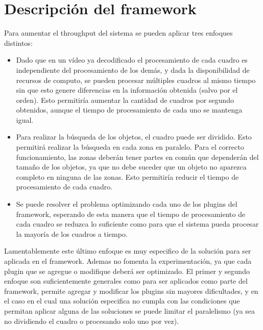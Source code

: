 
\section{Descripción del framework}

Para aumentar el throughput del sistema se pueden aplicar tres enfoques distintos:

\begin{itemize}

\item 	Dado que en un vídeo ya decodificado el procesamiento de cada cuadro es
	independiente del procesamiento de los demás, y dada la disponibilidad
	de recursos de computo, se pueden procesar múltiples cuadros al mismo
	tiempo sin que esto genere diferencias en la información obtenida (salvo
	por el orden). Esto permitiría aumentar la cantidad de cuadros por
	segundo obtenidos, aunque el tiempo de procesamiento de cada uno se
	mantenga igual.

\item	Para realizar la búsqueda de los objetos, el cuadro puede ser dividido.
	Esto permitirá realizar la búsqueda en cada zona en paralelo. Para el
	correcto funcionamiento, las zonas deberán tener partes en común que
	dependerán del tamaño de los objetos, ya que no debe suceder que un
	objeto no aparezca completo en ninguna de las zonas. Esto permitiría
	reducir el tiempo de procesamiento de cada cuadro.

\item	Se puede resolver el problema optimizando cada uno de los plugins del
	framework, esperando de esta manera que el tiempo de procesamiento de
	cada cuadro se reduzca lo suficiente como para que el sistema pueda
	procesar la mayoría de los cuadros a tiempo.

\end{itemize}

Lamentablemente este último enfoque es muy especifico de la solución para ser
aplicada en el framework. Ademas no fomenta la experimentación, ya que cada
plugin que se agregue o modifique deberá ser optimizado. El primer y segundo
enfoque son suficientemente generales como para ser aplicados como parte del
framework, permite agregar y modificar los plugins sin mayores dificultades, y
en el caso en el cual una solución especifica no cumpla con las condiciones que
permitan aplicar alguna de las soluciones se puede limitar el paralelismo (ya
sea no dividiendo el cuadro o procesando solo uno por vez).

